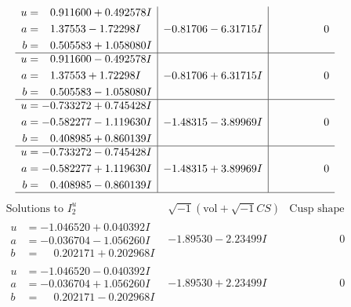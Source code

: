 \documentclass[1p]{elsarticle_modified}
\theoremstyle{definition}
\newcommand{\I}{\sqrt{-1}}
\begin{document}
$$\begin{array}{c|c|c}
\begin{aligned}
u &= \phantom{-}0.911600 + 0.492578 I \\
a &= \phantom{-}1.37553 - 1.72298 I \\
b &= \phantom{-}0.505583 + 1.058080 I\end{aligned}
 & -0.81706 - 6.31715 I & \phantom{-0.000000 } 0 \\ \hline\begin{aligned}
u &= \phantom{-}0.911600 - 0.492578 I \\
a &= \phantom{-}1.37553 + 1.72298 I \\
b &= \phantom{-}0.505583 - 1.058080 I\end{aligned}
 & -0.81706 + 6.31715 I & \phantom{-0.000000 } 0 \\ \hline\begin{aligned}
u &= -0.733272 + 0.745428 I \\
a &= -0.582277 - 1.119630 I \\
b &= \phantom{-}0.408985 + 0.860139 I\end{aligned}
 & -1.48315 - 3.89969 I & \phantom{-0.000000 } 0 \\ \hline\begin{aligned}
u &= -0.733272 - 0.745428 I \\
a &= -0.582277 + 1.119630 I \\
b &= \phantom{-}0.408985 - 0.860139 I\end{aligned}
 & -1.48315 + 3.89969 I & \phantom{-0.000000 } 0\\
 \hline 
 \end{array}$$\newpage$$\begin{array}{c|c|c}  
\text{Solutions to }I^u_{2}& \I (\text{vol} + \sqrt{-1}CS) & \text{Cusp shape}\\
 \hline 
\begin{aligned}
u &= -1.046520 + 0.040392 I \\
a &= -0.036704 - 1.056260 I \\
b &= \phantom{-}0.202171 + 0.202968 I\end{aligned}
 & -1.89530 - 2.23499 I & \phantom{-0.000000 } 0 \\ \hline\begin{aligned}
u &= -1.046520 - 0.040392 I \\
a &= -0.036704 + 1.056260 I \\
b &= \phantom{-}0.202171 - 0.202968 I\end{aligned}
 & -1.89530 + 2.23499 I & \phantom{-0.000000 } 0 \\ \hline\begin{aligned}

\end{aligned}
\end{array}$$
\end{document}
